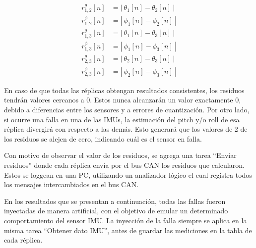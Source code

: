 \begin{subequations}
    \begin{align}
        r_{1,2}^\theta[n] &= \left| \ \theta_1[n] - \theta_2[n] \ \right|\\
        r_{1,2}^\phi[n]   &= \left| \ \phi_1[n]   - \phi_2[n]   \ \right|\\
        r_{1,3}^\theta[n] &= \left| \ \theta_1[n] - \theta_3[n] \ \right|\\
        r_{1,3}^\phi[n]   &= \left| \ \phi_1[n]   - \phi_3[n]   \ \right|\\
        r_{2,3}^\theta[n] &= \left| \ \theta_2[n] - \theta_3[n] \ \right|\\
        r_{2,3}^\phi[n]   &= \left| \ \phi_2[n]   - \phi_3[n]   \ \right|
    \end{align}
\end{subequations}

En caso de que todas las réplicas obtengan resultados consistentes, los residuos tendrán valores cercanos a 0. Estos nunca alcanzarán un valor exactamente 0, debido a diferencias entre los sensores y a errores de cuantización. Por otro lado, si ocurre una falla en una de las IMUs, la estimación del pitch y/o roll de esa réplica divergirá con respecto a las demás. Esto generará que los valores de 2 de los residuos se alejen de cero, indicando cuál es el sensor en falla.

Con motivo de observar el valor de los residuos, se agrega una tarea ``Enviar residuos'' donde cada réplica envía por el bus CAN los residuos que calcularon. Estos se loggean en una PC, utilizando un analizador lógico el cual registra todos los mensajes intercambiados en el bus CAN.

En los resultados que se presentan a continuación, todas las fallas fueron inyectadas de manera artificial, con el objetivo de emular un determinado comportamiento del sensor IMU. La inyección de la falla siempre se aplica en la misma tarea ``Obtener dato IMU'', antes de guardar las mediciones en la tabla de cada réplica.

